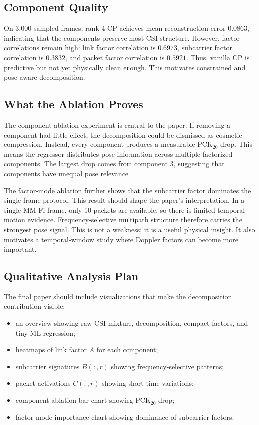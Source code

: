 \documentclass[letterpaper]{article}
\begin{document}
\subsection{Component Quality}

On 3,000 sampled frames, rank-4 CP achieves mean reconstruction error $0.0863$, indicating that the components preserve most CSI structure. However, factor correlations remain high: link factor correlation is $0.6973$, subcarrier factor correlation is $0.3832$, and packet factor correlation is $0.5921$. Thus, vanilla CP is predictive but not yet physically clean enough. This motivates constrained and pose-aware decomposition.

\subsection{What the Ablation Proves}

The component ablation experiment is central to the paper. If removing a component had little effect, the decomposition could be dismissed as cosmetic compression. Instead, every component produces a measurable PCK$_{20}$ drop. This means the regressor distributes pose information across multiple factorized components. The largest drop comes from component 3, suggesting that components have unequal pose relevance.

The factor-mode ablation further shows that the subcarrier factor dominates the single-frame protocol. This result should shape the paper's interpretation. In a single MM-Fi frame, only 10 packets are available, so there is limited temporal motion evidence. Frequency-selective multipath structure therefore carries the strongest pose signal. This is not a weakness; it is a useful physical insight. It also motivates a temporal-window study where Doppler factors can become more important.

\subsection{Qualitative Analysis Plan}

The final paper should include visualizations that make the decomposition contribution visible:
\begin{itemize}
    \item an overview showing raw CSI mixture, decomposition, compact factors, and tiny ML regression;
    \item heatmaps of link factor $A$ for each component;
    \item subcarrier signatures $B(:,r)$ showing frequency-selective patterns;
    \item packet activations $C(:,r)$ showing short-time variations;
    \item component ablation bar chart showing PCK$_{20}$ drop;
    \item factor-mode importance chart showing dominance of subcarrier factors.
\end{itemize}
\end{document}
